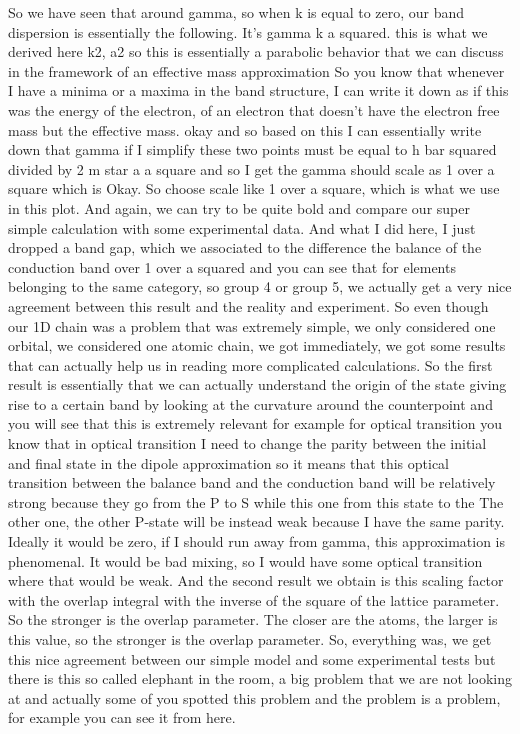 So we have seen that around gamma, so when k is equal to zero, our band dispersion is essentially the following. It's gamma k a squared. this is what we derived here k2, a2 so this is essentially a parabolic behavior that we can discuss in the framework of an effective mass approximation So you know that whenever I have a minima or a maxima in the band structure, I can write it down as if this was the energy of the electron, of an electron that doesn't have the electron free mass but the effective mass. okay and so based on this I can essentially write down that gamma if I simplify these two points must be equal to h bar squared divided by 2 m star a a square and so I get the gamma should scale as 1 over a square which is Okay. So choose scale like 1 over a square, which is what we use in this plot. And again, we can try to be quite bold and compare our super simple calculation with some experimental data. And what I did here, I just dropped a band gap, which we associated to the difference the balance of the conduction band over 1 over a squared and you can see that for elements belonging to the same category, so group 4 or group 5, we actually get a very nice agreement between this result and the reality and experiment. So even though our 1D chain was a problem that was extremely simple, we only considered one orbital, we considered one atomic chain, we got immediately, we got some results that can actually help us in reading more complicated calculations. So the first result is essentially that we can actually understand the origin of the state giving rise to a certain band by looking at the curvature around the counterpoint and you will see that this is extremely relevant for example for optical transition you know that in optical transition I need to change the parity between the initial and final state in the dipole approximation so it means that this optical transition between the balance band and the conduction band will be relatively strong because they go from the P to S while this one from this state to the The other one, the other P-state will be instead weak because I have the same parity. Ideally it would be zero, if I should run away from gamma, this approximation is phenomenal. It would be bad mixing, so I would have some optical transition where that would be weak. And the second result we obtain is this scaling factor with the overlap integral with the inverse of the square of the lattice parameter. So the stronger is the overlap parameter. The closer are the atoms, the larger is this value, so the stronger is the overlap parameter. So, everything was, we get this nice agreement between our simple model and some experimental tests but there is this so called elephant in the room, a big problem that we are not looking at and actually some of you spotted this problem and the problem is a problem, for example you can see it from here.
